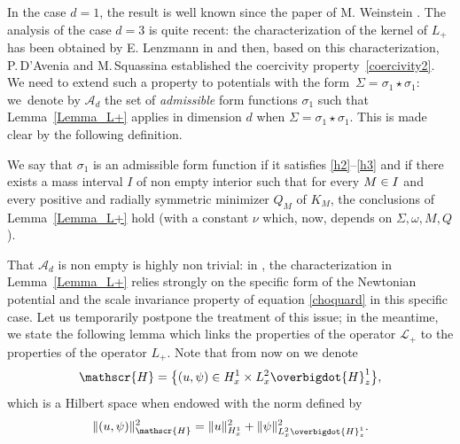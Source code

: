 In the case $d=1$, the result is well known since the paper of M. Weinstein \cite{Weinstein1}. The analysis of the case $d=3$ is quite recent: the characterization of the kernel of $L_{+}$ has been obtained by E. Lenzmann in \cite[Th.\,4]{Lenzmann} and then, based on this characterization, P.\,D'Avenia and M.\,Squassina \cite[Lem.\,2.7]{Avenia_Squassina} established the coercivity property~\eqref{coercivity2}.
We need to extend such a property to potentials with the form~\hbox{$\Sigma=\sigma_{1}\star\sigma_{1}$}:
we~\hbox{denote} by $\mathscr{A}_{d}$ the set of \emph{admissible} form functions
$\sigma_{1}$ such that Lemma~\ref{Lemma_L+} applies in dimension $d$ when $\Sigma=\sigma_{1}\star\sigma_{1}$.
This is made clear by the following definition.

\begin{defin}\label{d:adm}
We say that $\sigma_{1}$ is an admissible form function if it satisfies \eqref{h2}--\eqref{h3} and if there exists a mass interval $I$ of non empty interior such that for every $M\in\nobreak I$ and every positive and radially symmetric minimizer $Q_{M}$ of $K_{M}$,
the conclusions of
Lemma~\ref{Lemma_L+} hold (with a constant $\nu$ which, now, depends on $\Sigma, \omega, M, Q$).
\end{defin}

That $\mathscr{A}_{d}$ is non empty is highly non trivial: in \cite{Lenzmann}, the characterization in Lemma~\ref{Lemma_L+} relies strongly
on the specific form of the Newtonian potential and the scale invariance property of equation \eqref{choquard} in this specific case. Let us temporarily postpone the treatment of this issue; in the meantime, we
state the following lemma which links the properties of the operator $\mathcal{L}_{+}$ to the properties of the operator $L_{+}$. Note that from now on we denote
\[
\mathscr{H}=\bigl \{(u,\psi) \in H_{x}^{1}\times L_{x}^{2}\overbigdot{H}_{z}^{1}\bigr\},
\]
which is a Hilbert space when endowed with the norm defined by
\[
\|(u,\psi) \|_{\mathscr{H}}^{2}=\|u\|_{H_{x}^{1}}^{2}+\|\psi\|_{L_{x}^{2}\overbigdot{H}_{z}^{1}}^{2}.
\]

